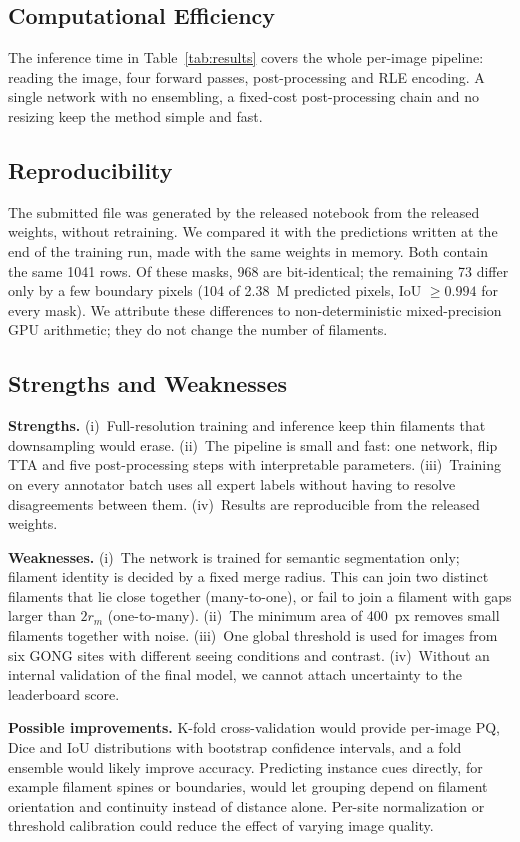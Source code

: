 \documentclass[sigconf]{acmart}
\begin{document}
\subsection{Computational Efficiency}
    The inference time in Table~\ref{tab:results} covers the whole per-image pipeline: reading the image, four forward passes, post-processing and RLE encoding. A single network with no ensembling, a fixed-cost post-processing chain and no resizing keep the method simple and fast.

\subsection{Reproducibility}
    The submitted file was generated by the released notebook from the released weights, without retraining. We compared it with the predictions written at the end of the training run, made with the same weights in memory. Both contain the same 1041 rows. Of these masks, 968 are bit-identical; the remaining 73 differ only by a few boundary pixels (104 of 2.38~M predicted pixels, IoU $\geq 0.994$ for every mask). We attribute these differences to non-deterministic mixed-precision GPU arithmetic; they do not change the number of filaments.

\subsection{Strengths and Weaknesses}
    \textbf{Strengths.} (i)~Full-resolution training and inference keep thin filaments that downsampling would erase. (ii)~The pipeline is small and fast: one network, flip TTA and five post-processing steps with interpretable parameters. (iii)~Training on every annotator batch uses all expert labels without having to resolve disagreements between them. (iv)~Results are reproducible from the released weights.

    \textbf{Weaknesses.} (i)~The network is trained for semantic segmentation only; filament identity is decided by a fixed merge radius. This can join two distinct filaments that lie close together (many-to-one), or fail to join a filament with gaps larger than $2r_m$ (one-to-many). (ii)~The minimum area of 400~px removes small filaments together with noise. (iii)~One global threshold is used for images from six GONG sites with different seeing conditions and contrast. (iv)~Without an internal validation of the final model, we cannot attach uncertainty to the leaderboard score.

    \textbf{Possible improvements.} K-fold cross-validation would provide per-image PQ, Dice and IoU distributions with bootstrap confidence intervals, and a fold ensemble would likely improve accuracy. Predicting instance cues directly, for example filament spines or boundaries, would let grouping depend on filament orientation and continuity instead of distance alone. Per-site normalization or threshold calibration could reduce the effect of varying image quality.
\end{document}
